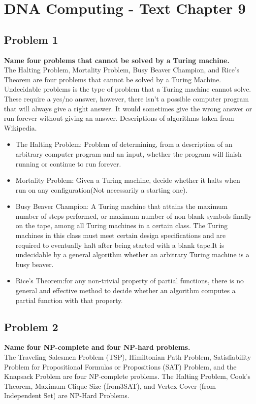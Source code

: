 
\chapter{DNA Computing - Text Chapter 9}


\section{ Problem 1 }
\textbf{ Name four problems that cannot be solved by a Turing machine. } \\
The Halting Problem, Mortality Problem, Busy Beaver Champion, and Rice's Theorem are four problems that cannot be solved by a Turing Machine. Undecidable problems is the type of problem that a Turing machine cannot solve. These require a yes/no answer, however, there isn't a possible computer program that will always give a right answer. It would sometimes give the wrong answer or run forever without giving an answer. Descriptions of algorithms taken from Wikipedia.
\begin{itemize}
	\item The Halting Problem: Problem of determining, from a description of an arbitrary computer program and an input, whether the program will finish running or continue to run forever.
	\item Mortality Problem: Given a Turing machine, decide whether it halts when run on any configuration(Not necessarily a starting one).
	\item Busy Beaver Champion: A Turing machine that attains the maximum number of steps performed, or maximum number of non blank symbols finally on the tape, among all Turing machines in a certain class. The Turing machines in this class must meet certain design specifications and are required to eventually halt after being started with a blank tape.It is undecidable by a general algorithm whether an arbitrary Turing machine is a busy beaver.
	\item Rice's Theorem:for any non-trivial property of partial functions, there is no general and effective method to decide whether an algorithm computes a partial function with that property.
\end{itemize}

\section{ Problem 2 }
\textbf{ Name four NP-complete and four NP-hard problems. } \\
The Traveling Salesmen Problem (TSP), Himiltonian Path Problem, Satisfiability Problem for Propositional Formulas or Propositions (SAT) Problem, and the Knapsack Problem are four NP-complete problems. The Halting Problem, Cook's Theorem, Maximum Clique Size (from3SAT), and Vertex Cover (from Independent Set) are NP-Hard Problems.

